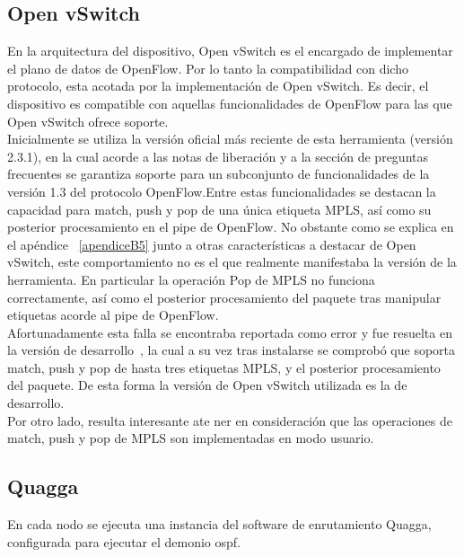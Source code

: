 \subsection{Open vSwitch}
En la arquitectura del dispositivo, Open vSwitch es el encargado de implementar el plano de datos de OpenFlow. Por lo tanto la compatibilidad con dicho protocolo, esta acotada por la implementaci\'on de Open vSwitch. Es decir, el dispositivo es compatible con aquellas funcionalidades de OpenFlow para las que Open vSwitch ofrece soporte.\\

Inicialmente se utiliza la versi\'on oficial m\'as reciente de esta herramienta (versi\'on 2.3.1), en la cual acorde a las notas de liberaci\'on y a la secci\'on de preguntas frecuentes se garantiza soporte para un subconjunto de funcionalidades de la versi\'on 1.3 del protocolo OpenFlow.Entre estas funcionalidades se destacan la capacidad para match, push y pop de una \'unica etiqueta MPLS, así como su posterior procesamiento en el pipe de OpenFlow. No obstante como se explica en el apéndice ~\ref{apendiceB5} junto a otras características a destacar de Open vSwitch, este comportamiento no es el que realmente manifestaba la versi\'on de la herramienta. En particular la operación Pop de MPLS no funciona correctamente, así como el posterior procesamiento del paquete tras manipular etiquetas acorde al pipe de OpenFlow.\\ 

Afortunadamente esta falla se encontraba reportada como error y fue resuelta en la versi\'on de desarrollo~\citep{OVSSourceCode}, la cual a su vez tras instalarse se comprobó que soporta match, push y pop de hasta tres etiquetas MPLS, y el posterior procesamiento del paquete. De esta forma la versi\'on de Open vSwitch utilizada es la de desarrollo.\\

Por otro lado, resulta interesante ate ner en consideraci\'on que las operaciones de match, push y pop de MPLS son implementadas en modo usuario.


\subsection{Quagga}
En cada nodo se ejecuta una instancia del software de enrutamiento Quagga, configurada para ejecutar el demonio ospf.\\ 

